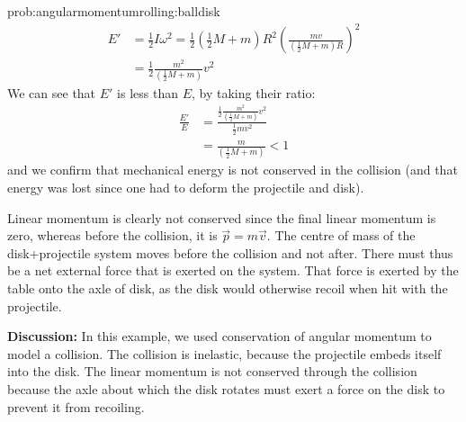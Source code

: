 \begin{solution}{prob:angularmomentumrolling:balldisk}
\begin{align*}
E' &= \frac{1}{2}I\omega^2 = \frac{1}{2} \left(\frac{1}{2}M+m\right)R^2 \left( \frac{mv}{\left(\frac{1}{2}M+m\right)R}\right)^2\\
&= \frac{1}{2} \frac{m^2}{\left(\frac{1}{2}M+m\right)} v^2
\end{align*}
We can see that $E'$ is less than $E$, by taking their ratio:
\begin{align*}
\frac{E'}{E} &= \frac{\frac{1}{2} \frac{m^2}{\left(\frac{1}{2}M+m\right)} v^2}{\frac{1}{2}mv^2}\\
&=\frac{m}{\left(\frac{1}{2}M+m\right)}<1
\end{align*}
and we confirm that mechanical energy is not conserved in the collision (and that energy was lost since one had to deform the projectile and disk).

Linear momentum is clearly not conserved since the final linear momentum is zero, whereas before the collision, it is $\vec p=m\vec v$. The centre of mass of the disk+projectile system moves before the collision and not after. There must thus be a net external force that is exerted on the system. That force is exerted by the table onto the axle of disk, as the disk would otherwise recoil when hit with the projectile.

\textbf{Discussion:} In this example, we used conservation of angular momentum to model a collision. The collision is inelastic, because the projectile embeds itself into the disk. The linear momentum is not conserved through the collision because the axle about which the disk rotates must exert a force on the disk to prevent it from recoiling. 
\end{solution}


